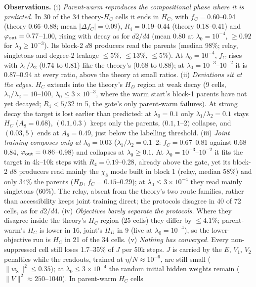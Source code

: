 \documentclass[10pt]{article}
\begin{document}
\textbf{Observations.}
(i) \emph{Parent-warm reproduces the compositional phase where it is predicted.}  In 30 of the
34 theory-$H_C$ cells it ends in $H_C$, with $f_C=0.60$--0.94 (theory 0.66--0.88; mean
$|\Delta f_C|=0.09$), $R_4=0.19$--0.44 (theory 0.18--0.41) and $\varphi_{\rm out}=0.77$--1.00,
rising with decay as for $d2/d4$ (mean 0.80 at $\lambda_0=10^{-4}$, $\ge0.92$ for
$\lambda_0\ge10^{-3}$).  Its block-2 $d8$ producers read the parents (median 98\%; relay, singletons
and degree-2 leakage $\le5\%$, $\le13\%$, $\le5\%$).  At $\lambda_0=10^{-4}$, $f_C$ rises with
$\lambda_1/\lambda_2$ (0.74 to 0.81) like the theory's (0.68 to 0.88); at
$\lambda_0=10^{-3}$--$10^{-2}$ it is 0.87--0.94 at every ratio, above the theory at small ratios.
(ii) \emph{Deviations sit at the edges.}  $H_C$ extends into the theory's $H_D$ region at weak
decay (9 cells, $\lambda_1/\lambda_2=10$--100, $\lambda_0\le3\times10^{-3}$, where the warm start's
block-1 parents have not yet decayed; $R_4<5/32$ in 5, the gate's only parent-warm failures).  At
strong decay the target is lost earlier than predicted: at $\lambda_0=0.1$ only
$\lambda_1/\lambda_2=0.1$ stays $H_C$ ($A_8=0.68$), $(0.1,0.3)$ keeps only the parents,
$(0.1,1$--$2)$ collapse, and $(0.03,5)$ ends at $A_8=0.49$, just below the labelling threshold.
(iii) \emph{Joint training composes only at $\lambda_0=0.03$} ($\lambda_1/\lambda_2=0.1$--2:
$f_C=0.67$--0.81 against 0.68--0.84, $\varphi_{\rm out}=0.86$--0.98) and collapses at
$\lambda_0\ge0.1$.  At $\lambda_0=10^{-3}$--$10^{-2}$ it fits the target in 4k--10k steps with
$R_4=0.19$--0.28, already above the gate, yet its block-2 $d8$ producers read mainly the $\chi_8$
mode built in block 1 (relay, median 58\%) and only 34\% the parents ($H_D$,
$f_C=0.15$--0.29); at $\lambda_0\le3\times10^{-4}$ they read mainly singletons (60\%).  The relay,
absent from the theory's two route families, rather than accessibility keeps joint training
direct; the protocols disagree in 40 of 72 cells, as for $d2/d4$.
(iv) \emph{Objectives barely separate the protocols.}  Where they disagree inside the theory's
$H_C$ region (25 cells) they differ by $\le4.1\%$; parent-warm's $H_C$ is lower in 16, joint's $H_D$
in 9 (five at $\lambda_0=10^{-4}$), so the lower-objective run is $H_C$ in 21 of the 34 cells.
(v) \emph{Nothing has converged.}  Every non-suppressed cell still loses 1.7--35\% of $J$ per 50k
steps.  $J$ is carried by the $E$, $V_1$, $V_2$ penalties while the readouts, trained at
$\eta/N\approx10^{-6}$, are still small ($\|w_8\|^2\le0.35$); at $\lambda_0\le3\times10^{-4}$ the
random initial hidden weights remain ($\|V\|^2\approx250$--1040).  In parent-warm $H_C$ cells
\end{document}
